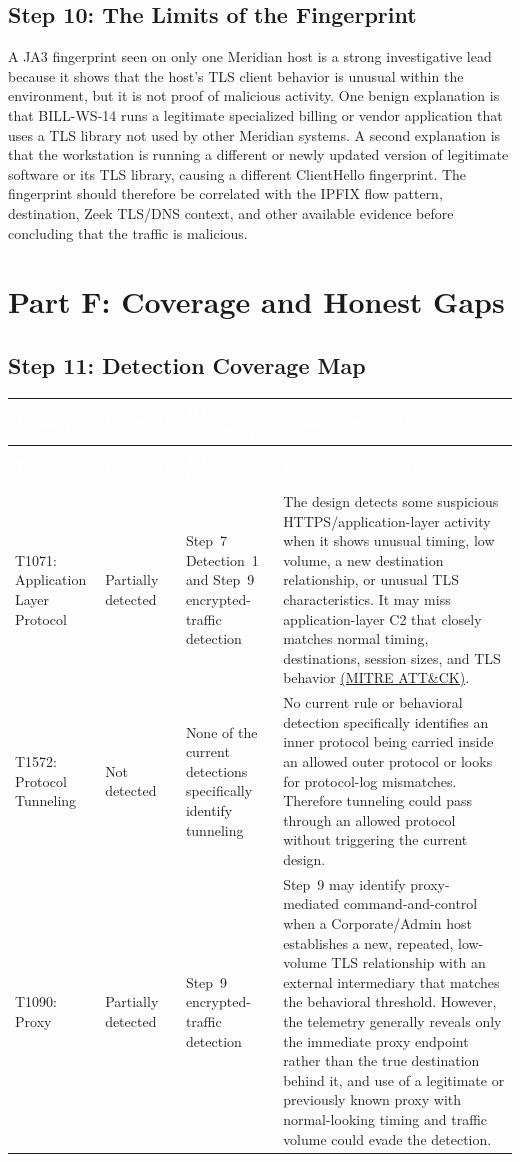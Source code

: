 \documentclass[11pt,letterpaper]{article}
\renewcommand{\arraystretch}{1.22}
\newcommand{\labtablesetup}{%
  \footnotesize
  \setlength{\tabcolsep}{4pt}%
  \renewcommand{\arraystretch}{1.28}%
}
\newcommand{\labstep}[1]{%
  \Needspace{8\baselineskip}%
  \subsection*{#1}%
  \nopagebreak
}
\newcommand{\labpartbig}[1]{%
  \par\vspace{0.15em}%
  \Needspace{22\baselineskip}%
  \section*{#1}%
  \nopagebreak
}
\newcommand{\aparef}[2]{\hyperref[ref:#1]{#2}}
\begin{document}
\labstep{Step 10: The Limits of the Fingerprint}

A JA3 fingerprint seen on only one Meridian host is a strong investigative lead because it shows that the host's TLS client behavior is unusual within the environment, but it is not proof of malicious activity. One benign explanation is that BILL-WS-14 runs a legitimate specialized billing or vendor application that uses a TLS library not used by other Meridian systems. A second explanation is that the workstation is running a different or newly updated version of legitimate software or its TLS library, causing a different ClientHello fingerprint. The fingerprint should therefore be correlated with the IPFIX flow pattern, destination, Zeek TLS/DNS context, and other available evidence before concluding that the traffic is malicious.

\labpartbig{Part F: Coverage and Honest Gaps}

\labstep{Step 11: Detection Coverage Map}

\begingroup\labtablesetup
\begin{xltabular}{\textwidth}{@{}L{3.0cm}L{1.9cm}L{2.6cm}Y@{}}
\toprule
{}
\textcolor{white}{\textbf{Technique}} &
\textcolor{white}{\textbf{Covered?}} &
\textcolor{white}{\textbf{Which Detection}} &
\textcolor{white}{\textbf{Confidence and Why}} \\
\endfirsthead
\toprule
{}
\textcolor{white}{\textbf{Technique}} &
\textcolor{white}{\textbf{Covered?}} &
\textcolor{white}{\textbf{Which Detection}} &
\textcolor{white}{\textbf{Confidence and Why}} \\
\endhead
\midrule
T1071: Application Layer Protocol &
Partially detected &
Step~7 Detection~1 and Step~9 encrypted-traffic detection &
The design detects some suspicious HTTPS/application-layer activity when it shows unusual timing, low volume, a new destination relationship, or unusual TLS characteristics. It may miss application-layer C2 that closely matches normal timing, destinations, session sizes, and TLS behavior \aparef{attack}{(MITRE ATT\&CK)}. \\
T1572: Protocol Tunneling &
Not detected &
None of the current detections specifically identify tunneling &
No current rule or behavioral detection specifically identifies an inner protocol being carried inside an allowed outer protocol or looks for protocol-log mismatches. Therefore tunneling could pass through an allowed protocol without triggering the current design. \\
T1090: Proxy &
Partially detected &
Step~9 encrypted-traffic detection &
Step~9 may identify proxy-mediated command-and-control when a Corporate/Admin host establishes a new, repeated, low-volume TLS relationship with an external intermediary that matches the behavioral threshold. However, the telemetry generally reveals only the immediate proxy endpoint rather than the true destination behind it, and use of a legitimate or previously known proxy with normal-looking timing and traffic volume could evade the detection. \\
\bottomrule
\end{xltabular}
\endgroup
\end{document}
